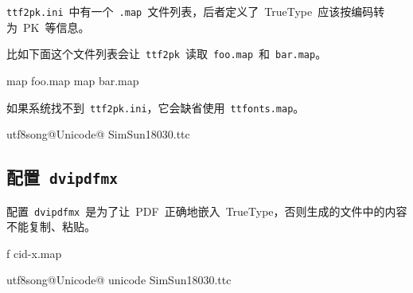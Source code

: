\verb|ttf2pk.ini|~中有一个~\verb|.map|~文件列表，后者定义了~TrueType~应该按编码转为~PK~等信息。

比如下面这个文件列表会让~\verb|ttf2pk|~读取~\verb|foo.map|~和~\verb|bar.map|。

\begin{code}
map foo.map
map bar.map
\end{code}

如果系统找不到~\verb|ttf2pk.ini|，它会缺省使用~\verb|ttfonts.map|。
\begin{code}
utf8song@Unicode@ SimSun18030.ttc
\end{code}

\subsection{配置~\texttt{dvipdfmx}}
配置~\verb|dvipdfmx|~是为了让~PDF~正确地嵌入~TrueType，否则生成的文件中的内容不能复制、粘贴。

\begin{code}
f cid-x.map
\end{code}

\begin{code}
utf8song@Unicode@ unicode SimSun18030.ttc
\end{code}



\newpage
